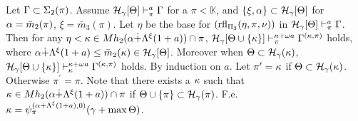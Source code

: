 \documentclass{article}
\newcommand{\mK}{\mathbb{K}}
\begin{document}
\edes







\blem\label{lem:lowerPi43b}
Let $\Gamma\subset\Sigma_{2}(\pi)$.
Assume
${\cal H}_{\gamma}[\Theta]\vdash^{a}_{\pi}\Gamma$ for a $\pi<\mK$, and $\{\xi,\alpha\}\subset{\cal H}_{\gamma}[\Theta]$ 
for $\alpha=\bar{m}_{2}(\pi)$, $\xi=\bar{m}_{3}(\pi)$.
Let $\eta$ be the base for $({\rm rfl}_{\Pi_{3}}(\eta,\pi,\nu))$ in ${\cal H}_{\gamma}[\Theta]\vdash^{a}_{\pi}\Gamma$.
Then for any $\eta<\kappa\in Mh_{2}(\alpha\dot{+}\Lambda^{\xi}(1+a))\cap \pi$,
${\cal H}_{\gamma}[\Theta\cup \{\kappa\}]\vdash^{\kappa+\omega a}_{\pi}\Gamma^{(\kappa,\pi)}$ holds, where
$\alpha\dot{+}\Lambda^{\xi}(1+a)\leq \bar{m}_{2}(\kappa)\in{\cal H}_{\gamma}[\Theta]$.
Moreover when $\Theta\subset{\cal H}_{\gamma}(\kappa)$,
${\cal H}_{\gamma}[\Theta\cup \{\kappa\}]\vdash^{\kappa+\omega a}_{\kappa}\Gamma^{(\kappa,\pi)}$ holds.
\elem
\bprf 
By induction on $a$.
Let $\pi^{\prime}=\kappa$ if $\Theta\subset{\cal H}_{\gamma}(\kappa)$. Otherwise $\pi^{\prime}=\pi$.
Note that there exists a $\kappa$ such that $\kappa\in Mh_{2}(\alpha\dot{+}\Lambda^{\xi}(1+a))\cap \pi$
if $\Theta\cup\{\pi\}\subset{\cal H}_{\gamma}(\pi)$.
F.e. $\kappa=\psi_{\pi}^{(\alpha+\Lambda^{\xi}(1+a),0)}(\gamma+\max\Theta)$.
\end{document}
